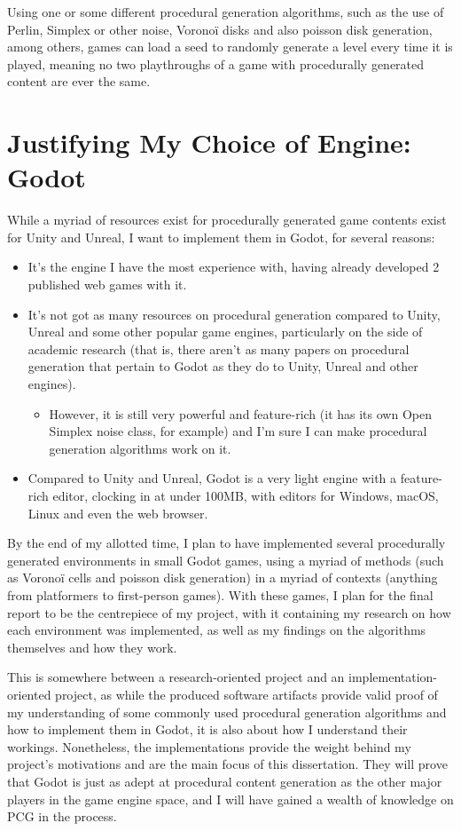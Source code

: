 Using one or some different procedural generation algorithms, such as the use of Perlin, Simplex or other noise, Voronoï disks and also poisson disk generation, among others, games can load a seed to randomly generate a level every time it is played, meaning no two playthroughs of a game with procedurally generated content are ever the same.

\section{Justifying My Choice of Engine: Godot}

While a myriad of resources exist for procedurally generated game contents exist for Unity and Unreal, I want to implement them in Godot, for several reasons:

\begin{itemize}
	\item It's the engine I have the most experience with, having already developed 2 published web games with it.
	\item It's not got as many resources on procedural generation compared to Unity, Unreal and some other popular game engines, particularly on the side of academic research (that is, there aren't as many papers on procedural generation that pertain to Godot as they do to Unity, Unreal and other engines).
	\begin{itemize}
		\item However, it is still very powerful and feature-rich (it has its own Open Simplex noise class, for example) and I'm sure I can make procedural generation algorithms work on it.
	\end{itemize}
	\item Compared to Unity and Unreal, Godot is a very light engine with a feature-rich editor, clocking in at under 100MB, with editors for Windows, macOS, Linux and even the web browser. 
\end{itemize}

By the end of my allotted time, I plan to have implemented several procedurally generated environments in small Godot games, using a myriad of methods (such as Voronoï cells and poisson disk generation) in a myriad of contexts (anything from platformers to first-person games). With these games, I plan for the final report to be the centrepiece of my project, with it containing my research on how each environment was implemented, as well as my findings on the algorithms themselves and how they work.

This is somewhere between a research-oriented project and an implementation-oriented project, as while the produced software artifacts provide valid proof of my understanding of some commonly used procedural generation algorithms and how to implement them in Godot, it is also about how I understand their workings. Nonetheless, the implementations provide the weight behind my project's motivations and are the main focus of this dissertation. They will prove that Godot is just as adept at procedural content generation as the other major players in the game engine space, and I will have gained a wealth of knowledge on PCG in the process.

